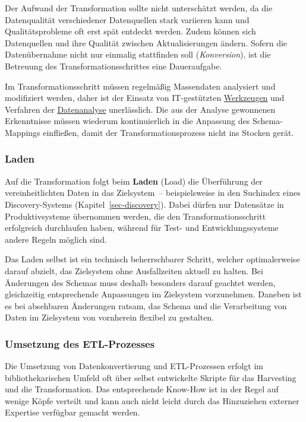 \documentclass[
  11pt,
  letterpaper,
  DIV=11,
  twoside]{scrreprt}
\begin{document}
Der Aufwand der Transformation sollte nicht unterschätzt werden, da die
Datenqualität verschiedener Datenquellen stark variieren kann und
Qualitätsprobleme oft erst spät entdeckt werden. Zudem können sich
Datenquellen und ihre Qualität zwischen Aktualisierungen ändern. Sofern
die Datenübernahme nicht nur einmalig stattfinden soll
(\emph{Konversion}), ist die Betreuung des Transformationsschrittes eine
Daueraufgabe.

Im Transformationsschritt müssen regelmäßig Massendaten analysiert und
modifiziert werden, daher ist der Einsatz von IT-gestützten
\hyperref[werkzeuge]{Werkzeugen} und Verfahren der
\hyperref[datenanalyse]{Datenanalyse} unerlässlich. Die aus der Analyse
gewonnenen Erkenntnisse müssen wiederum kontinuierlich in die Anpassung
des Schema-Mappings einfließen, damit der Transformationsprozess nicht
ins Stocken gerät.

\subsubsection{Laden}\label{laden}

Auf die Transformation folgt beim \textbf{Laden} (Load) die Überführung
der vereinheitlichten Daten in das Zielsystem~-- beispielsweise in den
Suchindex eines Discovery-Systems (Kapitel~\ref{sec-discovery}). Dabei
dürfen nur Datensätze in Produktivsysteme übernommen werden, die den
Transformationsschritt erfolgreich durchlaufen haben, während für Test-
und Entwicklungssysteme andere Regeln möglich sind.

Das Laden selbst ist ein technisch beherrschbarer Schritt, welcher
optimalerweise darauf abzielt, das Zielsystem ohne Ausfallzeiten aktuell
zu halten. Bei Änderungen des Schemas muss deshalb besonders darauf
geachtet werden, gleichzeitig entsprechende Anpassungen im Zielsystem
vorzunehmen. Daneben ist es bei absehbaren Änderungen ratsam, das Schema
und die Verarbeitung von Daten im Zielsystem von vornherein flexibel zu
gestalten.

\subsubsection{Umsetzung des
ETL-Prozesses}\label{umsetzung-des-etl-prozesses}

Die Umsetzung von Datenkonvertierung und ETL-Prozessen erfolgt im
bibliothekarischen Umfeld oft über selbst entwickelte Skripte für das
Harvesting und die Transformation. Das entsprechende Know-How ist in der
Regel auf wenige Köpfe verteilt und kann auch nicht leicht durch das
Hinzuziehen externer Expertise verfügbar gemacht werden.
\end{document}
